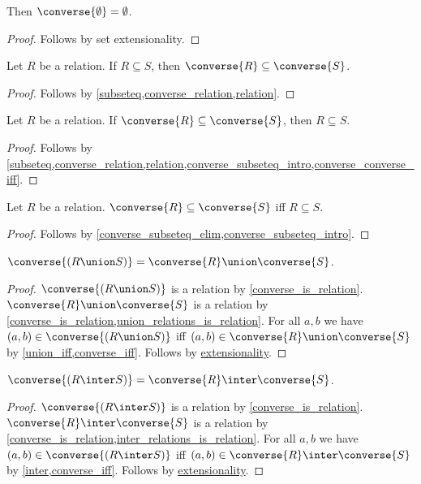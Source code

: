 \begin{proposition}\label{converse_emptyset}
    Then $\converse{\emptyset} = \emptyset$.
\end{proposition}
\begin{proof}
    Follows by set extensionality.
\end{proof}

\begin{proposition}\label{converse_subseteq_intro}
    Let $R$ be a relation.
    If $R\subseteq S$, then $\converse{R}\subseteq\converse{S}$.
\end{proposition}
\begin{proof}
    Follows by \cref{subseteq,converse_relation,relation}.
\end{proof}

\begin{proposition}\label{converse_subseteq_elim}
    Let $R$ be a relation.
    If $\converse{R}\subseteq\converse{S}$, then $R\subseteq S$.
\end{proposition}
\begin{proof}
    Follows by \cref{subseteq,converse_relation,relation,converse_subseteq_intro,converse_converse_iff}.
\end{proof}

\begin{proposition}\label{converse_subseteq_iff}
    Let $R$ be a relation.
    $\converse{R}\subseteq\converse{S}$ iff $R\subseteq S$.
\end{proposition}
\begin{proof}
    Follows by \cref{converse_subseteq_elim,converse_subseteq_intro}.
\end{proof}

\begin{proposition}\label{converse_union}
    $\converse{(R\union S)} = \converse{R}\union\converse{S}$.
\end{proposition}
\begin{proof}
    $\converse{(R\union S)}$ is a relation by \cref{converse_is_relation}.
    $\converse{R}\union\converse{S}$ is a relation by \cref{converse_is_relation,union_relations_is_relation}.
    For all $a,b$ we have $(a,b)\in\converse{(R\union S)}$ iff $(a,b)\in\converse{R}\union\converse{S}$
        by \cref{union_iff,converse_iff}.
    Follows by \hyperref[relext]{extensionality}.
\end{proof}

\begin{proposition}\label{converse_inter}
    $\converse{(R\inter S)} = \converse{R}\inter\converse{S}$.
\end{proposition}
\begin{proof}
    $\converse{(R\inter S)}$ is a relation by \cref{converse_is_relation}.
    $\converse{R}\inter\converse{S}$ is a relation by \cref{converse_is_relation,inter_relations_is_relation}.
    For all $a,b$ we have $(a,b)\in\converse{(R\inter S)}$ iff $(a,b)\in\converse{R}\inter\converse{S}$
        by \cref{inter,converse_iff}.
    Follows by \hyperref[relext]{extensionality}.
\end{proof}

